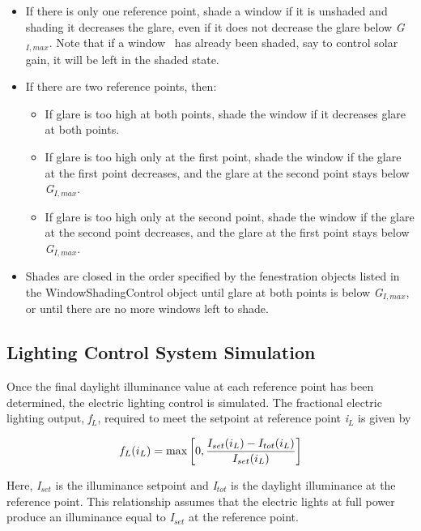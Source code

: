 \begin{itemize}
\item
  If there is only one reference point, shade a window if it is unshaded and shading it decreases the glare, even if it does not decrease the glare below \emph{G\(_{I,max}\)}. Note that if a window~ has already been shaded, say to control solar gain, it will be left in the shaded state.

\item
  If there are two reference points, then:

  \begin{itemize}
  \tightlist
  \item
    If glare is too high at both points, shade the window if it decreases glare at both points.
  \item
    If glare is too high only at the first point, shade the window if the glare at the first point decreases, and the glare at the second point stays below \emph{G\(_{I,max}\)}.
  \item
    If glare is too high only at the second point, shade the window if the glare at the second point decreases, and the glare at the first point stays below \emph{G\(_{I,max}\)}.
  \end{itemize}

\item
  Shades are closed in the order specified by the fenestration objects listed in the WindowShadingControl object until glare at both points is below \emph{G\(_{I,max}\)}, or until there are no more windows left to shade.

\end{itemize}

\subsection{Lighting Control System Simulation}\label{lighting-control-system-simulation}

Once the final daylight illuminance value at each reference point has been determined, the electric lighting control is simulated. The fractional electric lighting output, \emph{f\(_{L}\)}, required to meet the setpoint at reference point \emph{i\(_{L}\)} is given by

\begin{equation}
{f_L}({i_L}) = {\rm{max}}\left[ {0,\frac{{{I_{set}}({i_L}) - {I_{tot}}({i_L})}}{{{I_{set}}({i_L})}}} \right]
\end{equation}

Here, \emph{I\(_{set}\)} is the illuminance setpoint and \emph{I\(_{tot}\)} is the daylight illuminance at the reference point. This relationship assumes that the electric lights at full power produce an illuminance equal to \emph{I\(_{set}\)} at the reference point.

